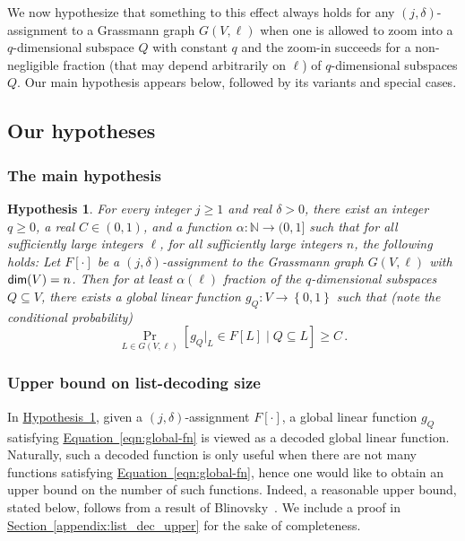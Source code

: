\documentclass[11pt]{article}
\numberwithin{equation}{section}
\theoremstyle{definition}
\theoremstyle{plain}
\newcommand{\expref}[2]{\hyperref[#2]{#1~\ref{#2}}}
\newcommand{\expeqref}[2]{\hyperref[#2]{#1~\eqref{#2}}}
\newtheorem{conj}[theorem]{Hypothesis}
\newcommand\set[1]{{\left\{ #1 \right\}}}
\newcommand\Prob[2]{{\Pr_{#1}\left[ {#2} \right]}}
\newcommand*\aconj[1]{\alpha{#1}}
\begin{document}
%
%
%
%
We now hypothesize that something to this effect always holds for any $(j,\delta)$-assignment to a Grassmann graph $G(V,\ell)$
when one is allowed to zoom into a $q$-dimensional subspace $Q$ with constant $q$ and the zoom-in succeeds for a non-negligible
fraction (that may depend arbitrarily on $\ell$)
of $q$-dimensional subspaces $Q$. Our main hypothesis appears below, followed by its variants and special cases.

\subsection{Our hypotheses}

%
\subsubsection{The main hypothesis}

\begin{conj}\label{conj:main2}
For every integer $j \geqslant 1$ and %
real  %
$\delta>0$, there exist an integer $q \geqslant 0$, %
a real  %
$C \in (0,1)$,
  and a function $\aconj\colon\mathbb{N}\to (0,1]$ such that
  for all sufficiently large integers $\ell$, for all sufficiently large integers $n$,
  the following holds:
  Let $F[\cdot]$ be a $(j,\delta)$-assignment to the Grassmann graph $G(V,\ell)$ with ${\sf dim}(V) = n$.
  Then for at least $\aconj{(\ell)}$ fraction of the $q$-dimensional subspaces $Q \subseteq V$,
  there exists a global linear function $g_Q: V \to \set{0,1}$ such that (note the conditional probability)
  \begin{equation} \label{eqn:global-fn} 
  \Prob{L \in G(V, \ell)}{g_Q|_L \in F[L] \mid Q \subseteq L}\geqslant C\,.%
  \end{equation}
\end{conj}


%
\subsubsection{Upper bound on list-decoding size}
In \expref{Hypothesis}{conj:main2}, given a $(j,\delta)$-assignment $F[\cdot]$,
a global linear function $g_Q$ satisfying
\expeqref{Equation}{eqn:global-fn} is viewed as a decoded
%
global linear function.
Naturally, such a decoded function is only useful when there are not many functions satisfying
\expeqref{Equation}{eqn:global-fn}, hence one would like to obtain an upper bound on the number of such
functions.
%
%
%
Indeed, a reasonable upper bound, stated below, follows from
%
a result    %
of Blinovsky~\cite{Bli1}.
We include a proof in \expref{Section}{appendix:list_dec_upper} for the sake of completeness.
\end{document}
